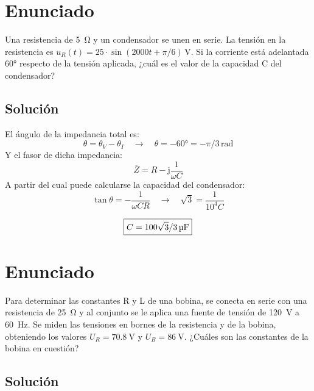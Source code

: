 \section{Enunciado}

Una resistencia de \qty{5}{\ohm} y un condensador se unen en serie. La tensión en la resistencia es $u_R(t) = 25 \cdot \sin(2000t + \pi/6)\,\si{\volt}$. Si la corriente está adelantada \ang{60} respecto de la tensión aplicada, ¿cuál es el valor de la capacidad C del condensador?

\subsection*{Solución}

El ángulo de la impedancia total es:
\begin{equation*}
    \theta = \theta_V - \theta_I \quad \rightarrow \quad \theta = -\ang{60} = -\pi/3\,\si{\radian}
\end{equation*}
Y el fasor de dicha impedancia: 
\begin{equation*}
    \overline{Z} = R - \mathrm{j} \frac{1}{\omega C}
  \end{equation*}
A partir del cual puede calcularse la capacidad del condensador: 
\begin{equation*}
  \tan \theta = - \frac{1}{\omega C R} \quad \rightarrow \quad \sqrt{3} = \frac{1}{10^4 C}
\end{equation*}

\begin{equation*}
  \boxed{C = \SI[parse-numbers = false]{100\sqrt{3}/3}{\micro\farad}}
\end{equation*}

\section{Enunciado}
Para determinar las constantes R y L de una bobina, se conecta en serie con una resistencia de \qty{25}{\ohm} y al conjunto se le aplica una fuente de tensión de \qty{120}{\volt} a \qty{60}{\hertz}. Se miden las tensiones en bornes de la resistencia y de la bobina, obteniendo los valores $U_R = \qty{70.8}{\volt}$ y $U_B = \qty{86}{\volt}$. ¿Cuáles son las constantes de la bobina en cuestión?

\subsection*{Solución}

